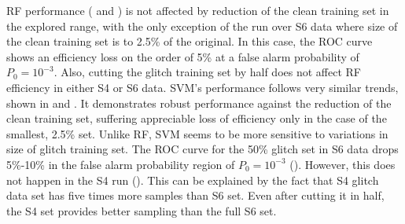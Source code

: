 \documentclass[prd, twocolumn, lengthcheck, superscriptaddress, showpacs, letterpaper, nofootinbib]{revtex4-1}
\begin{document}
%        



\ac{RF} performance ( and ) is not affected by reduction of the clean training set in the explored range, with the only exception of the run over S6 data where size of the clean training set is to 2.5\% of the original. In this case, the \ac{ROC} curve shows an efficiency loss on the order of 5\% at a false alarm probability of $P_{0}=10^{-3}$. Also, cutting the glitch training set by half does not affect \ac{RF} efficiency in either S4 or S6 data. 
\ac{SVM}'s performance follows very similar trends, shown in  and . It demonstrates robust performance against the reduction of the clean training set, suffering appreciable loss of efficiency only in the case of the smallest, 2.5\% set. Unlike \ac{RF}, \ac{SVM} seems to be more sensitive to variations in size of glitch training set. The \ac{ROC} curve for the 50\% glitch set in S6 data drops 5\%-10\% in the false alarm probability region of $P_{0}=10^{-3}$ (). However, this does not happen in the S4 run (). This can be explained by the fact that S4 glitch data set has five times more samples than S6 set. Even after cutting it in half, the S4 set provides better sampling than the full S6 set. 
\end{document}
